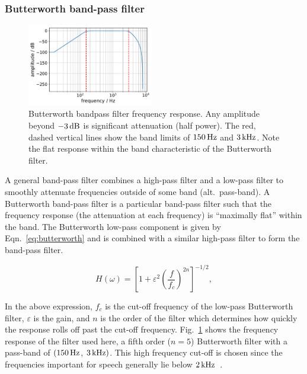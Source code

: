 \documentclass[paper-main.tex]{subfiles}
\begin{document}

\subsubsection{Butterworth band-pass filter}

\begin{figure}
	\includegraphics[width=0.49\textwidth]{figures/butterworth_150_3000.pdf}
	\caption{Butterworth bandpass filter frequency response. Any amplitude beyond $-3\,{\rm dB}$ is significant attenuation (half power). The red, dashed vertical lines show the band limits of $150\,{\rm Hz}$ and $3\,{\rm kHz}$. Note the flat response within the band characteristic of the Butterworth filter.}
	\label{fig:butterworth}
\end{figure}

A general band-pass filter combines a high-pass filter and a low-pass filter to smoothly attenuate frequencies outside of some band (alt.\ pass-band). A Butterworth band-pass filter is a particular band-pass filter such that the frequency response (the attenuation at each frequency) is ``maximally flat'' within the band. The Butterworth low-pass component is given by Eqn.~\ref{eq:butterworth} and is combined with a similar high-pass filter to form the band-pass filter.

\begin{equation}
\label{eq:butterworth}
H(\omega) = \left[1+\varepsilon^2 \left( \frac{f}{f_c} \right)^{2n}\right]^{-1/2},
\end{equation}

In the above expression, $f_c$ is the cut-off frequency of the low-pass Butterworth filter, $\varepsilon$ is the gain, and $n$ is the order of the filter which determines how quickly the response rolls off past the cut-off frequency. Fig.~\ref{fig:butterworth} shows the frequency response of the filter used here, a fifth order ($n = 5$) Butterworth filter with a pass-band of $(150\,{\rm Hz}$, $3\,{\rm kHz})$. This high frequency cut-off is chosen since the frequencies important for speech generally lie below $2\,{\rm kHz}$~\cite{speech_intelligibility}.
\end{document}
